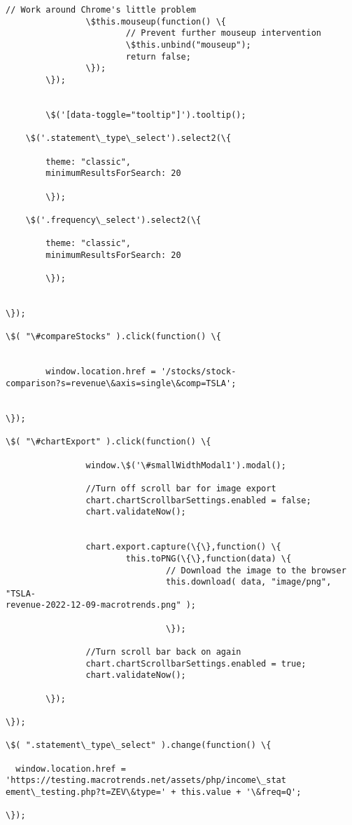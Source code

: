 \documentclass[11pt]{article}
\begin{document}
\begin{Verbatim}[commandchars=\\\{\}]
                // Work around Chrome's little problem
                \$this.mouseup(function() \{
                        // Prevent further mouseup intervention
                        \$this.unbind("mouseup");
                        return false;
                \});
        \});


        \$('[data-toggle="tooltip"]').tooltip();

    \$('.statement\_type\_select').select2(\{

        theme: "classic",
        minimumResultsForSearch: 20

        \});

    \$('.frequency\_select').select2(\{

        theme: "classic",
        minimumResultsForSearch: 20

        \});


\});

\$( "\#compareStocks" ).click(function() \{


        window.location.href = '/stocks/stock-
comparison?s=revenue\&axis=single\&comp=TSLA';


\});

\$( "\#chartExport" ).click(function() \{

                window.\$('\#smallWidthModal1').modal();

                //Turn off scroll bar for image export
                chart.chartScrollbarSettings.enabled = false;
                chart.validateNow();


                chart.export.capture(\{\},function() \{
                        this.toPNG(\{\},function(data) \{
                                // Download the image to the browser
                                this.download( data, "image/png", "TSLA-
revenue-2022-12-09-macrotrends.png" );

                                \});

                //Turn scroll bar back on again
                chart.chartScrollbarSettings.enabled = true;
                chart.validateNow();

        \});

\});

\$( ".statement\_type\_select" ).change(function() \{

  window.location.href = 'https://testing.macrotrends.net/assets/php/income\_stat
ement\_testing.php?t=ZEV\&type=' + this.value + '\&freq=Q';

\});


\end{Verbatim}
\end{document}

